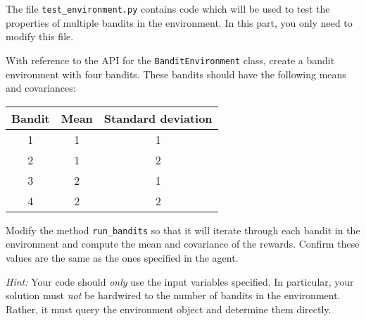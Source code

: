 \documentclass[twoside]{ucl_exam}
\begin{document}
\begin{question}

The file \texttt{test\_environment.py} contains code which will be used to test
the properties of multiple bandits in the environment. In this part, you only
need to modify this file.

\begin{subquestion}

With reference to the API for the \texttt{BanditEnvironment} class, create a
bandit environment with four bandits. These bandits should have the following
means and covariances:

\begin{center}
\begin{tabular}{|c|c|c|}\hline
Bandit&Mean&Standard deviation\\\hline
1&1&1\\
2&1&2\\
3&2&1\\
4&2&2\\\hline
\end{tabular}
\end{center}

\end{subquestion}

\begin{subquestion}

Modify the method \texttt{run\_bandits} so that it will iterate through each
bandit in the environment and compute the mean and covariance of the rewards.
Confirm these values are the same as the ones specified in the agent.

\emph{Hint:} Your code should \emph{only\/} use the input variables specified.
In particular, your solution must \emph{not\/} be hardwired to the number of
bandits in the environment. Rather, it must query the environment object and
determine them directly.

\end{subquestion}

\end{question}
\end{document}
